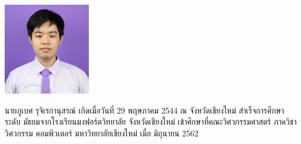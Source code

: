 \documentclass[semifinal]{cpecmu}
\author{นายภูเบศ รุจิเรกานุสรณ์}{Phubet Rujirekanusorn}{620610804}
\begin{document}


\pagestyle{empty}\cleardoublepage
\normalspacing \setcounter{page}{1}  \pagestyle{cpecmu}





\ifproject

\fi



% 



\begin{biosketch}
\begin{center}
  \includegraphics[width=1.5in]{phuruji.jpg}
\end{center}
นายภูเบศ รุจิเรกานุสรณ์ เกิดเมื่อวันที่ 29 พฤษภาคม 2544 ณ จังหวัดเชียงใหม่ สําเร็จการศึกษาระดับ
มัธยมจากโรงเรียนมงฟอร์ตวิทยาลัย จังหวัดเชียงใหม่ เข้าศึกษาที่คณะวิศวกรรมศาสตร์ ภาควิชาวิศวกรรม
คอมพิวเตอร์ มหาวิทยาลัยเชียงใหม่ เมื่อ มิถุนายน 2562

\end{biosketch}
\fi %
\end{document}
